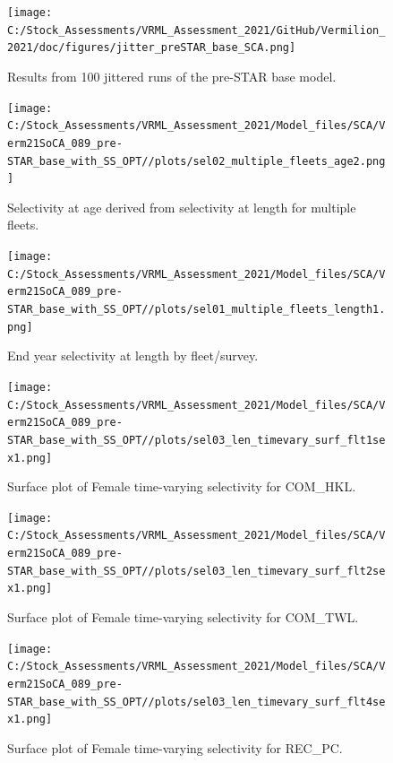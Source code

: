 \documentclass[11pt,
  english,
  a4paper,
]{article}
\begin{document}
\begin{figure}
\centering
\texttt{[image: C:/Stock\_Assessments/VRML\_Assessment\_2021/GitHub/Vermilion\_2021/doc/figures/jitter\_preSTAR\_base\_SCA.png]}
\caption{Results from 100 jittered runs of the pre-STAR base model.\label{fig:jitter}}
\end{figure}

\clearpage
\FloatBarrier

\FloatBarrier

\begin{figure}
\centering
\texttt{[image: C:/Stock\_Assessments/VRML\_Assessment\_2021/Model\_files/SCA/Verm21SoCA\_089\_pre-STAR\_base\_with\_SS\_OPT//plots/sel02\_multiple\_fleets\_age2.png]}
\caption{Selectivity at age derived from selectivity at length for multiple fleets.\label{fig:selex-age-all}}
\end{figure}

\FloatBarrier

\begin{figure}
\centering
\texttt{[image: C:/Stock\_Assessments/VRML\_Assessment\_2021/Model\_files/SCA/Verm21SoCA\_089\_pre-STAR\_base\_with\_SS\_OPT//plots/sel01\_multiple\_fleets\_length1.png]}
\caption{End year selectivity at length by fleet/survey.\label{fig:selex-length-all}}
\end{figure}

\FloatBarrier

\begin{figure}
\centering
\texttt{[image: C:/Stock\_Assessments/VRML\_Assessment\_2021/Model\_files/SCA/Verm21SoCA\_089\_pre-STAR\_base\_with\_SS\_OPT//plots/sel03\_len\_timevary\_surf\_flt1sex1.png]}
\caption{Surface plot of Female time-varying selectivity for COM\_HKL.\label{fig:sel03_len_timevary_surf_flt1sex1}}
\end{figure}

\begin{figure}
\centering
\texttt{[image: C:/Stock\_Assessments/VRML\_Assessment\_2021/Model\_files/SCA/Verm21SoCA\_089\_pre-STAR\_base\_with\_SS\_OPT//plots/sel03\_len\_timevary\_surf\_flt2sex1.png]}
\caption{Surface plot of Female time-varying selectivity for COM\_TWL.\label{fig:sel03_len_timevary_surf_flt2sex1}}
\end{figure}

\begin{figure}
\centering
\texttt{[image: C:/Stock\_Assessments/VRML\_Assessment\_2021/Model\_files/SCA/Verm21SoCA\_089\_pre-STAR\_base\_with\_SS\_OPT//plots/sel03\_len\_timevary\_surf\_flt4sex1.png]}
\caption{Surface plot of Female time-varying selectivity for REC\_PC.\label{fig:sel03_len_timevary_surf_flt4sex1}}
\end{figure}
\end{document}
